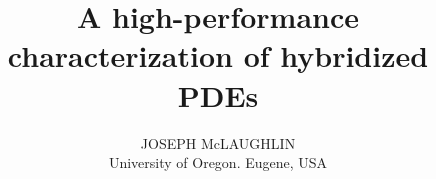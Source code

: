 \title{A high-performance characterization of hybridized PDEs}
\author{\small{JOSEPH McLAUGHLIN}\\ University of Oregon. Eugene, USA}